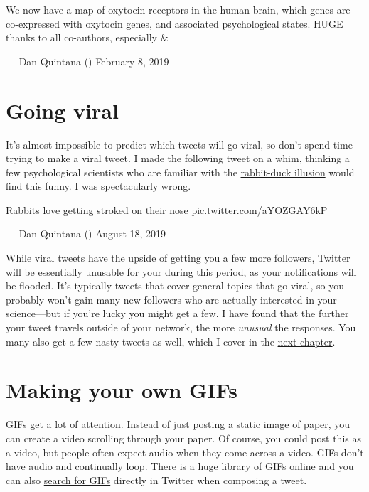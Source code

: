 \documentclass[]{book}
\begin{document}
We now have a map of oxytocin receptors in the human brain, which genes are co-expressed with oxytocin genes, and associated psychological states. HUGE thanks to all co-authors, especially \citet{jarekrokicki} \& \citet{larswestlye}

--- Dan Quintana (\citet{dsquintana}) February 8, 2019

\hypertarget{going-viral}{%
\section{Going viral}\label{going-viral}}

It's almost impossible to predict which tweets will go viral, so don't spend time trying to make a viral tweet. I made the following tweet on a whim, thinking a few psychological scientists who are familiar with the \href{https://en.wikipedia.org/wiki/Rabbit\%E2\%80\%93duck_illusion}{rabbit-duck illusion} would find this funny. I was spectacularly wrong.

Rabbits love getting stroked on their nose pic.twitter.com/aYOZGAY6kP

--- Dan Quintana (\citet{dsquintana}) August 18, 2019

While viral tweets have the upside of getting you a few more followers, Twitter will be essentially unusable for your during this period, as your notifications will be flooded. It's typically tweets that cover general topics that go viral, so you probably won't gain many new followers who are actually interested in your science---but if you're lucky you might get a few. I have found that the further your tweet travels outside of your network, the more \emph{unusual} the responses. You many also get a few nasty tweets as well, which I cover in the \protect\hyperlink{care}{next chapter}.

\hypertarget{making-your-own-gifs}{%
\section{Making your own GIFs}\label{making-your-own-gifs}}

GIFs get a lot of attention. Instead of just posting a static image of paper, you can create a video scrolling through your paper. Of course, you could post this as a video, but people often expect audio when they come across a video. GIFs don't have audio and continually loop. There is a huge library of GIFs online and you can also \href{https://help.twitter.com/en/using-twitter/tweeting-gifs-and-pictures}{search for GIFs} directly in Twitter when composing a tweet.
\end{document}
